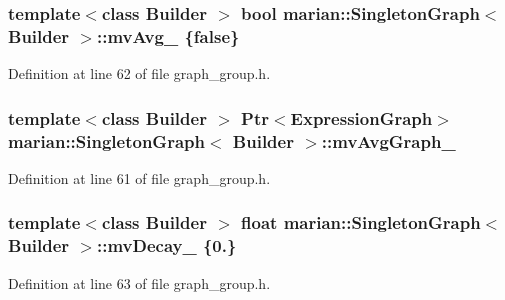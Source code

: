 \subsubsection[{\texorpdfstring{mv\+Avg\+\_\+}{mvAvg_}}]{\setlength{\rightskip}{0pt plus 5cm}template$<$class Builder $>$ bool {\bf marian\+::\+Singleton\+Graph}$<$ Builder $>$\+::mv\+Avg\+\_\+ \{false\}\hspace{0.3cm}{\ttfamily [private]}}\hypertarget{classmarian_1_1SingletonGraph_a0042dd92280399263ed59814f6ddc888}{}\label{classmarian_1_1SingletonGraph_a0042dd92280399263ed59814f6ddc888}


Definition at line 62 of file graph\+\_\+group.\+h.

\subsubsection[{\texorpdfstring{mv\+Avg\+Graph\+\_\+}{mvAvgGraph_}}]{\setlength{\rightskip}{0pt plus 5cm}template$<$class Builder $>$ {\bf Ptr}$<${\bf Expression\+Graph}$>$ {\bf marian\+::\+Singleton\+Graph}$<$ Builder $>$\+::mv\+Avg\+Graph\+\_\+\hspace{0.3cm}{\ttfamily [private]}}\hypertarget{classmarian_1_1SingletonGraph_a758bb5163433f420a53bcaa36702e19b}{}\label{classmarian_1_1SingletonGraph_a758bb5163433f420a53bcaa36702e19b}


Definition at line 61 of file graph\+\_\+group.\+h.

\subsubsection[{\texorpdfstring{mv\+Decay\+\_\+}{mvDecay_}}]{\setlength{\rightskip}{0pt plus 5cm}template$<$class Builder $>$ float {\bf marian\+::\+Singleton\+Graph}$<$ Builder $>$\+::mv\+Decay\+\_\+ \{0.\}\hspace{0.3cm}{\ttfamily [private]}}\hypertarget{classmarian_1_1SingletonGraph_aa594adad6639933f26d5e50ef8bdb0f5}{}\label{classmarian_1_1SingletonGraph_aa594adad6639933f26d5e50ef8bdb0f5}


Definition at line 63 of file graph\+\_\+group.\+h.

